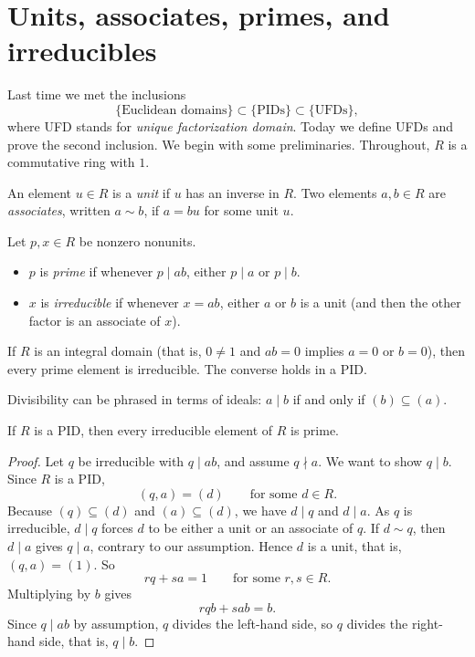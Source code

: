 \documentclass[reqno,11pt]{amsart}
\begin{document}
\raggedbottom
\makelecturetitle

\section{Units, associates, primes, and irreducibles}

Last time we met the inclusions
\[
  \{\text{Euclidean domains}\}\subset\{\text{PIDs}\}\subset\{\text{UFDs}\},
\]
where UFD stands for \emph{unique factorization domain}. Today we
define UFDs and prove the second inclusion. We begin with some
preliminaries. Throughout, $R$ is a commutative ring with $1$.

\begin{define}
An element $u\in R$ is a \emph{unit} if $u$ has an inverse in $R$.
Two elements $a,b\in R$ are \emph{associates}, written $a\sim b$,
if $a=bu$ for some unit $u$.
\end{define}

\begin{define}
Let $p,x\in R$ be nonzero nonunits.
\begin{itemize}
  \item $p$ is \emph{prime} if whenever $p\mid ab$, either $p\mid a$
  or $p\mid b$.
  \item $x$ is \emph{irreducible} if whenever $x=ab$, either $a$ or
  $b$ is a unit (and then the other factor is an associate of $x$).
\end{itemize}
\end{define}

If $R$ is an integral domain (that is, $0\neq1$ and $ab=0$ implies $a=0$ or
$b=0$), then every prime element is irreducible. The converse holds
in a PID.

\begin{remark}
Divisibility can be phrased in terms of ideals:
$a\mid b$ if and only if $(b)\subseteq(a)$.
\end{remark}

\begin{lemma}\label{lem:irred-prime}
If $R$ is a PID, then every irreducible element of $R$ is prime.
\end{lemma}
\begin{proof}
Let $q$ be irreducible with $q\mid ab$, and assume $q\nmid a$.
We want to show $q\mid b$. Since $R$ is a PID,
\[
  (q,a)=(d)\qquad\text{for some }d\in R.
\]
Because $(q)\subseteq(d)$ and $(a)\subseteq(d)$, we have $d\mid q$
and $d\mid a$. As $q$ is irreducible, $d\mid q$ forces $d$ to be
either a unit or an associate of $q$. If $d\sim q$, then $d\mid a$
gives $q\mid a$, contrary to our assumption. Hence $d$ is a unit,
that is, $(q,a)=(1)$. So
\[
  rq+sa=1\qquad\text{for some }r,s\in R.
\]
Multiplying by $b$ gives
\[
  rqb+sab=b.
\]
Since $q\mid ab$ by assumption, $q$ divides the left-hand side, so
$q$ divides the right-hand side, that is, $q\mid b$.
\end{proof}
\end{document}
